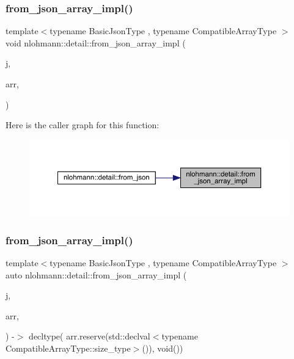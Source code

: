 \subsubsection{\texorpdfstring{from\_json\_array\_impl()}{from\_json\_array\_impl()}\hspace{0.1cm}{\footnotesize\ttfamily [1/2]}}
{\footnotesize\ttfamily template$<$typename Basic\+Json\+Type , typename Compatible\+Array\+Type $>$ \\
void nlohmann\+::detail\+::from\+\_\+json\+\_\+array\+\_\+impl (\begin{DoxyParamCaption}\item[{const Basic\+Json\+Type \&}]{j,  }\item[{Compatible\+Array\+Type \&}]{arr,  }\item[{\mbox{\hyperlink{structnlohmann_1_1detail_1_1priority__tag}{priority\+\_\+tag}}$<$ 0 $>$}]{ }\end{DoxyParamCaption})}

Here is the caller graph for this function\+:
\nopagebreak
\begin{figure}[H]
\begin{center}
\leavevmode
\includegraphics[width=350pt]{namespacenlohmann_1_1detail_ac53673a5ce29fb69b96d41dad33cb3b0_icgraph}
\end{center}
\end{figure}
\mbox{\label{namespacenlohmann_1_1detail_a57f93ed57254a1639087cdc316e0fb83}} 
\subsubsection{\texorpdfstring{from\_json\_array\_impl()}{from\_json\_array\_impl()}\hspace{0.1cm}{\footnotesize\ttfamily [2/2]}}
{\footnotesize\ttfamily template$<$typename Basic\+Json\+Type , typename Compatible\+Array\+Type $>$ \\
auto nlohmann\+::detail\+::from\+\_\+json\+\_\+array\+\_\+impl (\begin{DoxyParamCaption}\item[{const Basic\+Json\+Type \&}]{j,  }\item[{Compatible\+Array\+Type \&}]{arr,  }\item[{\mbox{\hyperlink{structnlohmann_1_1detail_1_1priority__tag}{priority\+\_\+tag}}$<$ 1 $>$}]{ }\end{DoxyParamCaption}) -\/$>$ decltype(
    arr.\+reserve(std\+::declval$<$typename Compatible\+Array\+Type\+::size\+\_\+type$>$()),
    void())
}

